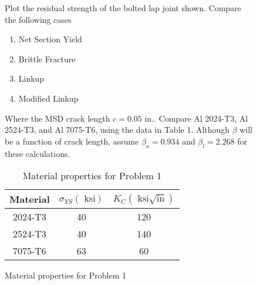 \documentclass[12pt, oneside]{article}
\begin{document}
\begin{enumerate}

\begin{figure}[H]
	\item Plot the residual strength of the bolted lap joint shown. Compare the following cases
	\begin{enumerate}
		\item Net Section Yield
		\item Brittle Fracture
		\item Linkup
		\item Modified Linkup
	\end{enumerate}
	Where the MSD crack length $c = 0.05 \text{ in.}$. Compare Al 2024-T3, Al 2524-T3, and Al 7075-T6, using the data in Table 1. Although $\beta$ will be a function of crack length, assume $\beta_a = 0.934$ and $\beta_l = 2.268$ for these calculations.
	\begin{table}[H]
		\centering
		\caption{Material properties for Problem 1}
	\begin{tabular}{ccc}
		Material  & $\sigma_{YS} (\text{ ksi})$ & $K_C (\text{ ksi}\sqrt{\text{in}})$ \\ 
		\hline 
		2024-T3 & 40 & 120 \\ 
		2524-T3  & 40 & 140 \\ 
		7075-T6 & 63 & 60
	\end{tabular} 
	\end{table}
\end{figure}


\end{enumerate}
\end{document}

